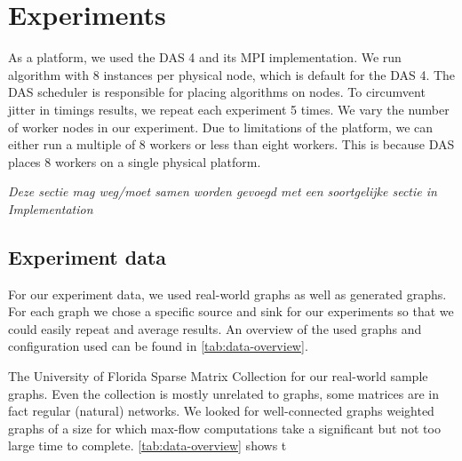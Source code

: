 \chapter{Experiments}
\label{chp:experiments}

As a platform, we used the DAS 4 and its MPI implementation. We run algorithm with 8 instances per physical node, which is default for the DAS 4. %
The DAS scheduler is responsible for placing algorithms on nodes. To circumvent jitter in timings results, we repeat each experiment 5 times. We vary the number of worker nodes in our experiment. Due to limitations of the platform, we can either run a multiple of 8 workers or less than eight workers. This is because DAS places 8 workers on a single physical platform.

\emph{Deze sectie mag weg/moet samen worden gevoegd met een soortgelijke sectie in Implementation}

\section{Experiment data}
For our experiment data, we used real-world graphs as well as generated graphs. For each graph we chose a specific source and sink for our experiments so that we could easily repeat and average results. An overview of the used graphs and configuration used can be found in \autoref{tab:data-overview}.

The University of Florida Sparse Matrix Collection \cite{FloridaSparseMatrix} for our real-world sample graphs. Even the collection is mostly unrelated to graphs, some matrices are in fact regular (natural) networks. We looked for well-connected graphs weighted graphs of a size for which max-flow computations take a significant but not too large time to complete. \autoref{tab:data-overview} shows t

